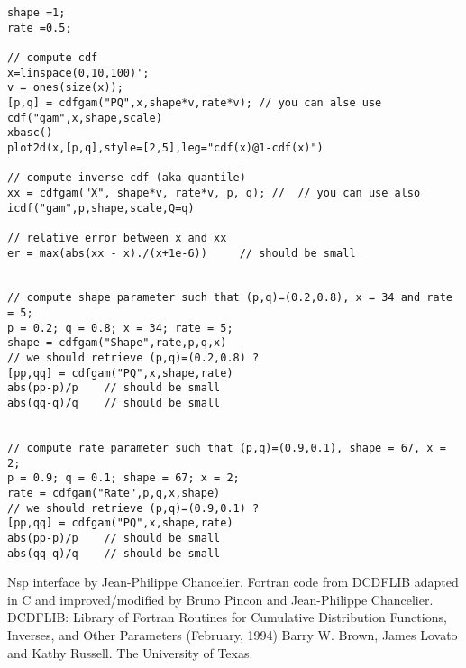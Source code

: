 \begin{examples}
\begin{Verbatim}
shape =1;
rate =0.5;

// compute cdf
x=linspace(0,10,100)';
v = ones(size(x));
[p,q] = cdfgam("PQ",x,shape*v,rate*v); // you can alse use  cdf("gam",x,shape,scale)
xbasc()
plot2d(x,[p,q],style=[2,5],leg="cdf(x)@1-cdf(x)")

// compute inverse cdf (aka quantile)
xx = cdfgam("X", shape*v, rate*v, p, q); //  // you can use also icdf("gam",p,shape,scale,Q=q)

// relative error between x and xx 
er = max(abs(xx - x)./(x+1e-6))     // should be small


// compute shape parameter such that (p,q)=(0.2,0.8), x = 34 and rate = 5;
p = 0.2; q = 0.8; x = 34; rate = 5;
shape = cdfgam("Shape",rate,p,q,x)
// we should retrieve (p,q)=(0.2,0.8) ?
[pp,qq] = cdfgam("PQ",x,shape,rate)
abs(pp-p)/p    // should be small
abs(qq-q)/q    // should be small


// compute rate parameter such that (p,q)=(0.9,0.1), shape = 67, x = 2;
p = 0.9; q = 0.1; shape = 67; x = 2;  
rate = cdfgam("Rate",p,q,x,shape)
// we should retrieve (p,q)=(0.9,0.1) ?
[pp,qq] = cdfgam("PQ",x,shape,rate)
abs(pp-p)/p    // should be small
abs(qq-q)/q    // should be small

\end{Verbatim}
%

\end{examples}

\begin{authors}
  Nsp interface by Jean-Philippe Chancelier. Fortran code from DCDFLIB
  adapted in C and improved/modified by Bruno Pincon and Jean-Philippe Chancelier.  
  DCDFLIB: Library of Fortran Routines for Cumulative Distribution
  Functions, Inverses, and Other Parameters (February, 1994)
  Barry W. Brown, James Lovato and Kathy Russell. The University of Texas.

\end{authors}
